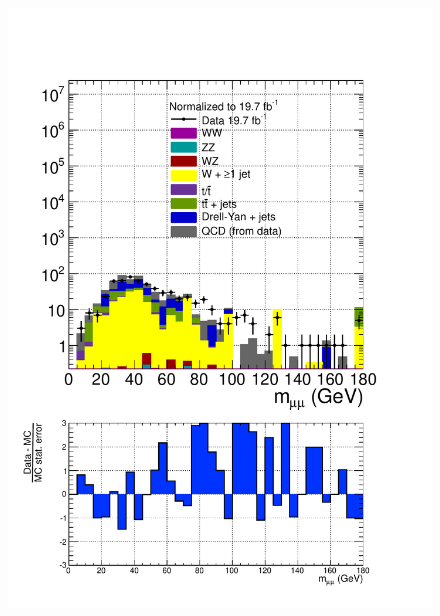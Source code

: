 \begin{figure}[hbtp]
  \begin{center}
    \includegraphics[width=\cmsFigWidth]{figures/dataVsMCQCD_mWMuTauMu_lowMT_v87}

\end{center}
\end{figure}
